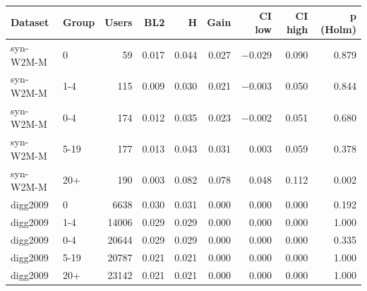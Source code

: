 \begin{tabular}{llrrrrrrr}
\toprule
Dataset & Group & Users & BL2 & H & Gain & CI low & CI high & p (Holm) \\
\midrule
syn-W2M-M & 0 & 59 & 0.017 & 0.044 & 0.027 & $-0.029$ & 0.090 & 0.879 \\
syn-W2M-M & 1-4 & 115 & 0.009 & 0.030 & 0.021 & $-0.003$ & 0.050 & 0.844 \\
syn-W2M-M & 0-4 & 174 & 0.012 & 0.035 & 0.023 & $-0.002$ & 0.051 & 0.680 \\
syn-W2M-M & 5-19 & 177 & 0.013 & 0.043 & 0.031 & 0.003 & 0.059 & 0.378 \\
syn-W2M-M & 20+ & 190 & 0.003 & 0.082 & 0.078 & 0.048 & 0.112 & 0.002 \\
digg2009 & 0 & 6638 & 0.030 & 0.031 & 0.000 & 0.000 & 0.000 & 0.192 \\
digg2009 & 1-4 & 14006 & 0.029 & 0.029 & 0.000 & 0.000 & 0.000 & 1.000 \\
digg2009 & 0-4 & 20644 & 0.029 & 0.029 & 0.000 & 0.000 & 0.000 & 0.335 \\
digg2009 & 5-19 & 20787 & 0.021 & 0.021 & 0.000 & 0.000 & 0.000 & 1.000 \\
digg2009 & 20+ & 23142 & 0.021 & 0.021 & 0.000 & 0.000 & 0.000 & 1.000 \\
\bottomrule
\end{tabular}
